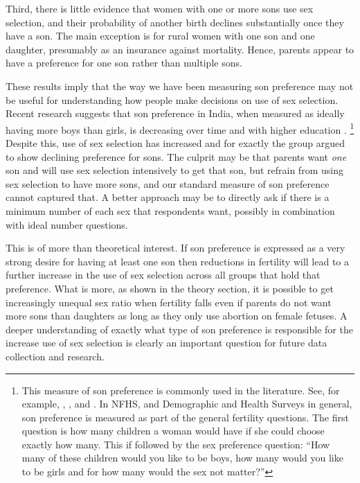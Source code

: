 \documentclass[12pt,letterpaper]{article}
\begin{document}
Third,  there is little evidence that women with one or more sons use sex selection,
and their probability of another birth declines substantially once they have a son.
The main exception is for rural women with one son and one daughter, presumably as an 
insurance against mortality.
Hence, parents appear to have a preference for one son rather than multiple sons.

These results imply that the way we have been measuring son preference may not be useful
for understanding how people make decisions on use of sex selection.
Recent research suggests that son preference in India, when measured as ideally having 
more boys than girls, is decreasing over time and with higher education \citep{bhat03,pande07}.%
\footnote{
This measure of son preference is commonly used in the literature. 
See, for example, \citet{clark00}, \citet{Jensen2009}, and \cite{Hu2015}.
In NFHS, and Demographic and Health Surveys in general, son preference is measured as part 
of the general fertility questions.
The first question is how many children a woman would have if she could choose exactly how 
many.
This if followed by the sex preference question:
``How many of these children would you like to be boys, how many would you like to be girls 
and for how many would the sex not matter?''
}
Despite this, use of sex selection has increased and for exactly the group 
argued to show declining preference for sons.
The culprit may be that parents want \emph{one} son and will use sex selection 
intensively to get that son, but refrain from using sex selection to have more sons, 
and our standard measure of son preference cannot captured that.
A better approach may be to directly ask if there is a minimum number of each sex that 
respondents want, possibly in combination with ideal number questions.

This is of more than theoretical interest.
If son preference is expressed as a very strong desire for having at least one
son then reductions in fertility will lead to a further increase in the use of sex 
selection across all groups that hold that preference.
What is more, as shown in the theory section, it is possible to get increasingly
unequal sex ratio when fertility falls even if parents do not want more sons
than daughters as long as they only use abortion on female fetuses.
A deeper understanding of exactly what type of son preference is responsible 
for the increase use of sex selection is clearly an important question for
future data collection and research.
\end{document}
